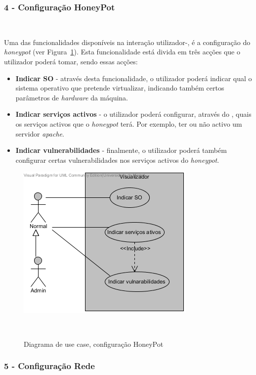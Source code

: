 \subsubsection{\textbf{4 - Configuração HoneyPot}}~\label{subsubsec: confighoney}

Uma das funcionalidades disponíveis na interação utilizador-\visualz, é a configuração do \emph{honeypot} (ver Figura~\ref{fig: confighoney}).
Esta funcionalidade está divida em três acções que o utilizador poderá tomar, sendo essas acções:

\begin{itemize}
 \item \textbf{Indicar SO} - através desta funcionalidade, o utilizador poderá indicar qual o sistema operativo que pretende virtualizar, indicando também certos parâmetros de \emph{hardware} da máquina.
 \item \textbf{Indicar serviços activos} - o utilizador poderá configurar, através do \visualz, quais os serviços activos que o \emph{honeypot} terá. Por exemplo, ter ou não activo um servidor \emph{apache}.
 \item \textbf{Indicar vulnerabilidades} - finalmente, o utilizador poderá também configurar certas vulnerabilidades nos serviços activos do \emph{honeypot}.
\end{itemize}

\begin{figure}[!htb]
	\centering
	\includegraphics[scale=0.80]{images/ucs/ConfHoneyPot}
	\caption {Diagrama de use case, configuração HoneyPot}~\label{fig: confighoney}
\end{figure}
\pagebreak

\subsubsection{\textbf{5 - Configuração Rede}}

